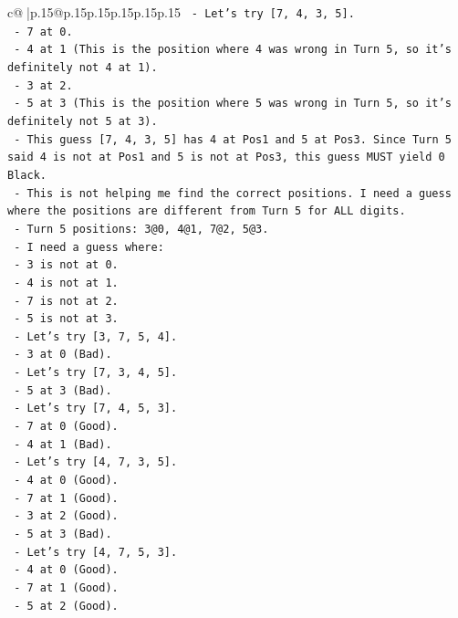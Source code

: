 \documentclass{article}
\begin{document}
{\begin{supertabular}{c@{$\;$}|p{.15\linewidth}@{}p{.15\linewidth}p{.15\linewidth}p{.15\linewidth}p{.15\linewidth}p{.15\linewidth}}
{{{\texttt{  {-} Let's try {[}7, 4, 3, 5{]}.} \\
\texttt{    {-} 7 at 0.} \\
\texttt{    {-} 4 at 1 (This is the position where 4 was wrong in Turn 5, so it's definitely not 4 at 1).} \\
\texttt{    {-} 3 at 2.} \\
\texttt{    {-} 5 at 3 (This is the position where 5 was wrong in Turn 5, so it's definitely not 5 at 3).} \\
\texttt{  {-} This guess {[}7, 4, 3, 5{]} has 4 at Pos1 and 5 at Pos3. Since Turn 5 said 4 is not at Pos1 and 5 is not at Pos3, this guess MUST yield 0 Black.} \\
\texttt{  {-} This is not helping me find the correct positions. I need a guess where the positions are different from Turn 5 for ALL digits.} \\
\texttt{  {-} Turn 5 positions: 3@0, 4@1, 7@2, 5@3.} \\
\texttt{  {-} I need a guess where:} \\
\texttt{    {-} 3 is not at 0.} \\
\texttt{    {-} 4 is not at 1.} \\
\texttt{    {-} 7 is not at 2.} \\
\texttt{    {-} 5 is not at 3.} \\
\texttt{  {-} Let's try {[}3, 7, 5, 4{]}.} \\
\texttt{    {-} 3 at 0 (Bad).} \\
\texttt{  {-} Let's try {[}7, 3, 4, 5{]}.} \\
\texttt{    {-} 5 at 3 (Bad).} \\
\texttt{  {-} Let's try {[}7, 4, 5, 3{]}.} \\
\texttt{    {-} 7 at 0 (Good).} \\
\texttt{    {-} 4 at 1 (Bad).} \\
\texttt{  {-} Let's try {[}4, 7, 3, 5{]}.} \\
\texttt{    {-} 4 at 0 (Good).} \\
\texttt{    {-} 7 at 1 (Good).} \\
\texttt{    {-} 3 at 2 (Good).} \\
\texttt{    {-} 5 at 3 (Bad).} \\
\texttt{  {-} Let's try {[}4, 7, 5, 3{]}.} \\
\texttt{    {-} 4 at 0 (Good).} \\
\texttt{    {-} 7 at 1 (Good).} \\
\texttt{    {-} 5 at 2 (Good).} \\
}}}
\end{supertabular}}
\end{document}
